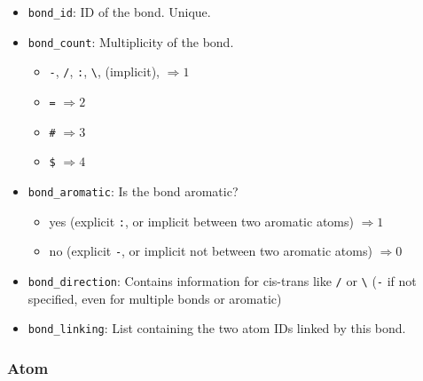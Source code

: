 \documentclass[a4paper, 11pt]{article}
\begin{document}
\begin{itemize}
    \item \texttt{bond\_id}: ID of the bond. Unique.
    \item \texttt{bond\_count}: Multiplicity of the bond. 
    \begin{itemize}
        \item \texttt{-}, \texttt{/}, \texttt{:}, \texttt{\textbackslash}, (implicit), $\Rightarrow 1$
        \item \texttt{=} $\Rightarrow 2$
        \item \texttt{\#} $\Rightarrow 3$
        \item \texttt{\$} $\Rightarrow 4$
    \end{itemize}
    \item \texttt{bond\_aromatic}: Is the bond aromatic?
    \begin{itemize}
        \item yes (explicit \texttt{:}, or implicit between two aromatic atoms) $\Rightarrow 1$
        \item no (explicit \texttt{-}, or implicit not between two aromatic atoms) $\Rightarrow 0$
    \end{itemize}
    \item \texttt{bond\_direction}: Contains information for cis-trans like \texttt{/} or \texttt{\textbackslash} (\texttt{-} if not specified, even for multiple bonds or aromatic)
    \item \texttt{bond\_linking}: List containing the two atom IDs linked by this bond.
\end{itemize}

\subsubsection{Atom}\label{subsubsec:atom}
\end{document}
